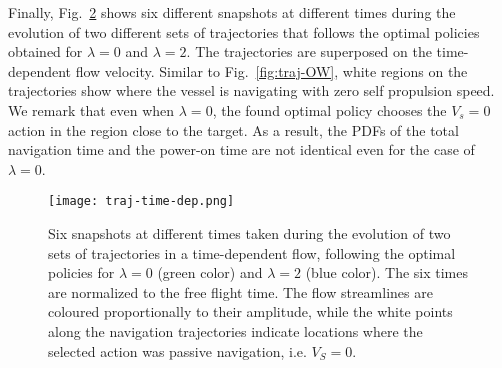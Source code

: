 \documentclass[
]{ceurart}
\def\obs#1{{\color{black}{#1}}}
\begin{document}
{\begin{figure}
\label{fig:time-dep-pdfs}
\end{figure}
Finally, Fig.~\ref{fig:time-dep-traj} shows six different snapshots at different times during the evolution of two different sets of trajectories that follows the optimal policies obtained for $\lambda=0$ and $\lambda=2$. The trajectories are superposed on the time-dependent flow velocity. Similar to Fig.~\ref{fig:traj-OW}, white regions on the trajectories show where the vessel is navigating with zero self propulsion speed. We remark that even when $\lambda=0$, the found optimal policy chooses the $V_s=0$ action in the region close to the target. As a result, the PDFs of the total navigation time and the power-on time are not identical even for the case of $\lambda=0$.
\obs{This is a very nice example of the fact that the resulting policy in RL benefits from the added control when the set of allowed actions is enlarged and that, in our particular application, passively moving with the flow can be better than navigating when the flow blows you in the right direction, independently of the requirement to minimize energy.}
\begin{figure}
\centering
\texttt{[image: traj-time-dep.png]}
\caption{Six snapshots at different times taken during the evolution of two sets of trajectories in a time-dependent flow, following the optimal policies for $\lambda=0$ (green color) and $\lambda=2$ (blue color). The six times are normalized to the free flight time. The flow streamlines are coloured proportionally to their amplitude, while the white points along the navigation trajectories indicate locations where the selected action was passive navigation, i.e. $V_S=0$.}
\label{fig:time-dep-traj}
\end{figure}}
\end{document}
